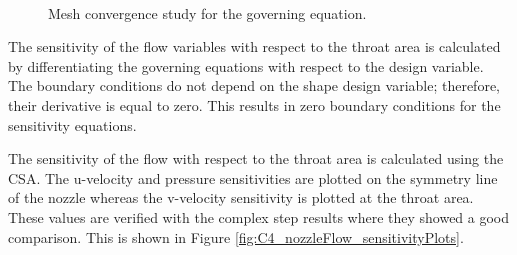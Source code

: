 \begin{figure}[H]
    \centering
    \quad
    \\
    \caption{Mesh convergence study for the governing equation.}
    \label{fig:C4_nozzleFlow_meshConvergenceRate}
\end{figure}

The sensitivity of the flow variables with respect to the throat area is calculated by differentiating the governing equations with respect to the design variable. The boundary conditions do not depend on the shape design variable; therefore, their derivative is equal to zero. This results in zero boundary conditions for the sensitivity equations.

The sensitivity of the flow with respect to the throat area is calculated using the CSA. The u-velocity and pressure sensitivities are plotted on the symmetry line of the nozzle whereas the v-velocity sensitivity is plotted at the throat area. These values are verified with the complex step results where they showed a good comparison. This is shown in Figure \ref{fig:C4_nozzleFlow_sensitivityPlots}.


